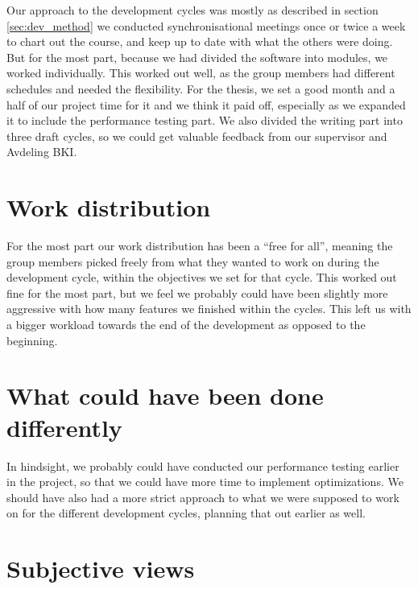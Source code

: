 Our approach to the development cycles was mostly as described in section
\ref{sec:dev_method} we conducted synchronisational meetings once or twice a
week to chart out the course, and keep up to date with what the others were
doing. But for the most part, because we had divided the software into modules, we worked
individually. This worked out well, as the group members had different schedules
and needed the flexibility. For the thesis, we set a good month and a half of
our project time for it and we think it paid off, especially as we expanded it to
include the performance testing part. We also divided the writing part into
three draft cycles, so we could get valuable feedback from our supervisor and
Avdeling BKI.

\section{Work distribution}
For the most part our work distribution has been a ``free for all'', meaning
the group members picked freely from what they wanted to work on during the
development cycle, within the objectives we set for that cycle. 
This worked out fine for the most part, but we feel we probably could have been
slightly more aggressive with how many features we finished within the
cycles. This left us with a bigger workload towards the end of the development
as opposed to the beginning.

\section{What could have been done differently}
In hindsight, we probably could have conducted our performance testing earlier
in the project, so that we could have more time to implement optimizations. We
should have also had a more strict approach to what we were supposed to work on
for the different development cycles, planning that out earlier as well.

\section{Subjective views}



